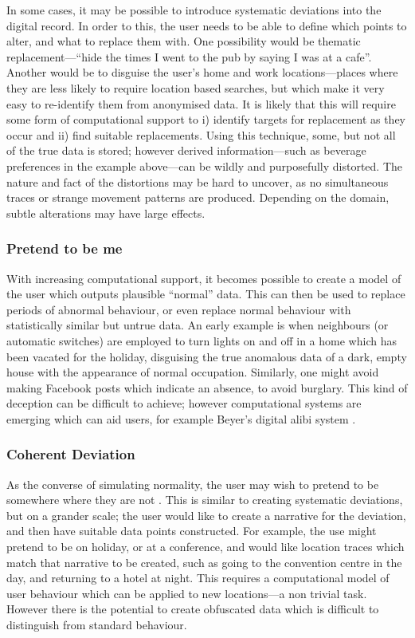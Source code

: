 \documentclass{IOS-Book-Article}     %
\newcommand{\tbox}[3][red]{{
\color{#1}\noindent{
   \fbox{\scriptsize{ {\bf #2} \textsl{#3}}}
   \vspace{2pt}
}
}}
\newcommand{\todo}[1]{\tbox{TODO:}{#1}}
\begin{document}
In some cases, it may be possible to introduce systematic deviations into the
digital record. In order to this, the user needs to be able to define which
points to alter, and what to replace them with. One possibility would be
thematic replacement---``hide the times I went to the pub by saying I
was at a cafe''. Another would be to disguise the user's home and work
locations---places where they are less likely to require location based
searches, but which make it very easy to re-identify them from anonymised data.
It is likely that this will require some form of computational support to i) identify targets for replacement as they occur and ii) find suitable replacements. Using this technique, some, but not all of the true data is stored; however derived information---such as beverage preferences in the
example above---can be wildly and purposefully distorted. The nature and fact of
the distortions may be hard to uncover, as no simultaneous traces or
strange movement patterns are produced. Depending on the domain, subtle
alterations may have large effects.
\todo{examples?}

\subsubsection{Pretend to be me}

With increasing computational support, it becomes possible to create a model of
the user which outputs plausible ``normal'' data. This can then be used to
replace periods of abnormal behaviour, or even replace normal behaviour with
statistically similar but untrue data. An early example is when neighbours (or
automatic switches) are employed to turn lights on and off in a home which has
been vacated for the holiday, disguising the true anomalous data of a dark,
empty house with the appearance of normal occupation. Similarly, one might avoid
making Facebook posts which indicate an absence, to avoid burglary. This kind of
deception can be difficult to achieve; however computational systems are
emerging which can aid users, for example Beyer's digital alibi system
\cite{beyer2014Alibi}.

\subsubsection{Coherent Deviation}
As the converse of simulating normality, the user may wish to pretend to be
somewhere where they are not \todo{more motivation for Alibot!}. This is similar
to creating systematic deviations, but on a grander scale; the user would like
to create a narrative for the deviation, and then have suitable data points
constructed. For example, the use might pretend to be on holiday, or at a
conference, and would like location traces which match that narrative to be
created, such as going to the convention centre in the day, and returning to a
hotel at night. This requires a computational model of user behaviour which can
be applied to new locations---a non trivial task. However there is the potential
to create obfuscated data which is difficult to distinguish from standard
behaviour. \todo{examples}
\end{document}
